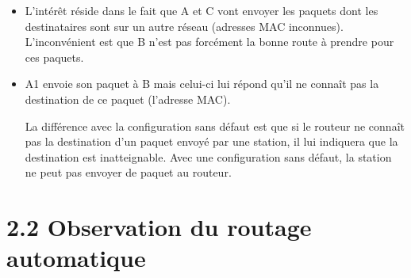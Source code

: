 \documentclass{article}
\begin{document}
\begin{itemize}
\item L'intérêt réside dans le fait que A et C vont envoyer les paquets dont les destinataires sont sur un autre réseau (adresses MAC inconnues).
L'inconvénient est que B n'est pas forcément la bonne route à prendre pour ces paquets.

\item A1 envoie son paquet à B mais celui-ci lui répond qu'il ne connaît pas la destination de ce paquet (l'adresse MAC).

La différence avec la configuration sans défaut est que si le routeur ne connaît pas la destination d'un paquet envoyé par une station, il lui indiquera que la destination est inatteignable. Avec une configuration sans défaut, la station ne peut pas envoyer de paquet au routeur.

\end{itemize}


\section*{2.2 Observation du routage automatique}
\end{document}
